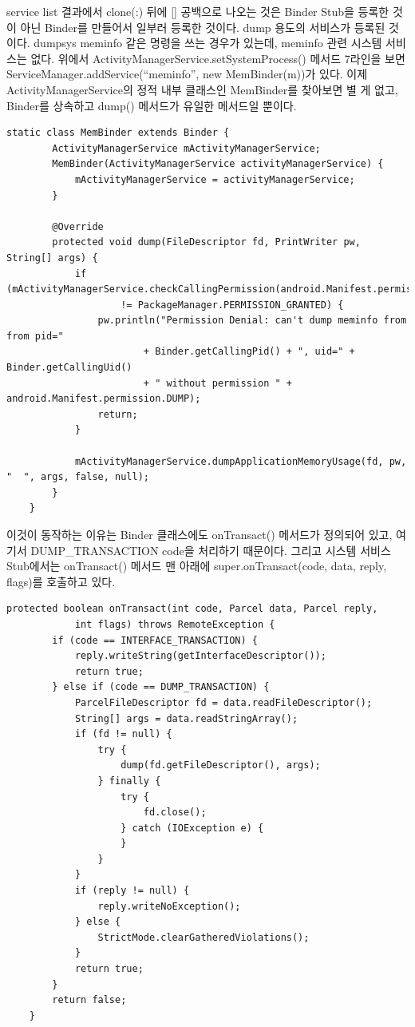 service list 결과에서 clone(:) 뒤에 [] 공백으로 나오는 것은 Binder Stub을 등록한 것이 아닌 Binder를 만들어서 일부러 등록한 것이다. dump 용도의 서비스가 등록된 것이다.
dumpsys meminfo 같은 명령을 쓰는 경우가 있는데, meminfo 관련 시스템 서비스는 없다. 위에서 ActivityManagerService.setSystemProcess() 메서드 7라인을 보면 ServiceManager.addService(``meminfo'', new MemBinder(m))가 있다.
이제 ActivityManagerService의 정적 내부 클래스인 MemBinder를 찾아보면 별 게 없고, Binder를 상속하고 dump() 메서드가 유일한 메서드일 뿐이다.
\begin{lstlisting}[frame=single]
    static class MemBinder extends Binder {
        ActivityManagerService mActivityManagerService;
        MemBinder(ActivityManagerService activityManagerService) {
            mActivityManagerService = activityManagerService;
        }

        @Override
        protected void dump(FileDescriptor fd, PrintWriter pw, String[] args) {
            if (mActivityManagerService.checkCallingPermission(android.Manifest.permission.DUMP)
                    != PackageManager.PERMISSION_GRANTED) {
                pw.println("Permission Denial: can't dump meminfo from from pid="
                        + Binder.getCallingPid() + ", uid=" + Binder.getCallingUid()
                        + " without permission " + android.Manifest.permission.DUMP);
                return;
            }

            mActivityManagerService.dumpApplicationMemoryUsage(fd, pw, "  ", args, false, null);
        }
    }
\end{lstlisting}
이것이 동작하는 이유는 Binder 클래스에도 onTransact() 메서드가 정의되어 있고,
여기서 DUMP\_TRANSAC\-TION code을 처리하기 때문이다.
그리고 시스템 서비스 Stub에서는 onTransact() 메서드 맨 아래에 super.onTransact(code, data, reply, flags)를 호출하고 있다.

\begin{lstlisting}[frame=single]
   protected boolean onTransact(int code, Parcel data, Parcel reply,
            int flags) throws RemoteException {
        if (code == INTERFACE_TRANSACTION) {
            reply.writeString(getInterfaceDescriptor());
            return true;
        } else if (code == DUMP_TRANSACTION) {
            ParcelFileDescriptor fd = data.readFileDescriptor();
            String[] args = data.readStringArray();
            if (fd != null) {
                try {
                    dump(fd.getFileDescriptor(), args);
                } finally {
                    try {
                        fd.close();
                    } catch (IOException e) {
                    }
                }
            }
            if (reply != null) {
                reply.writeNoException();
            } else {
                StrictMode.clearGatheredViolations();
            }
            return true;
        }
        return false;
    }
\end{lstlisting}


